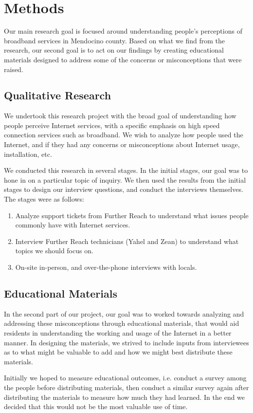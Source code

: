 \section{Methods}
\label{sec:methods}

Our main research goal is focused around understanding people's perceptions of
broadband services in Mendocino county. Based on what we find from the research,
our second goal is to act on our findings by creating educational materials
designed to address some of the concerns or misconceptions that were raised.

\subsection{Qualitative Research}

We undertook this research project with the broad goal of understanding how
people perceive Internet services, with a specific emphasis on high speed
connection services such as broadband. We wish to analyze how people used
the Internet, and if they had any concerns or misconceptions about Internet
usage, installation, etc.

We conducted this research in several stages. In the initial stages, our goal
was to hone in on a particular topic of inquiry. We then used the results from the
initial stages to design our interview questions, and conduct the interviews
themselves. The stages were as follows:

\begin{enumerate}
\item Analyze support tickets from Further Reach to understand what issues
people commonly have with Internet services.
\item Interview Further Reach technicians (Yahel and Zean) to understand what
topics we should focus on.
\item On-site in-person, and over-the-phone interviews with locals.
\end{enumerate}

\subsection{Educational Materials}

In the second part of our project, our goal was to worked towards analyzing
and addressing these misconceptions through educational materials, that would
aid residents in understanding the working and usage of the Internet in a
better manner. In designing the materials, we strived to include inputs from
interviewees as to what might be valuable to add and how we might best
distribute these materials.

Initially we hoped to measure educational outcomes, i.e. conduct a survey among the people before
distributing materials, then  conduct a similar survey again after distributing the materials
to measure how much they had learned. In the end we decided that this would
not be the most valuable use of time.

